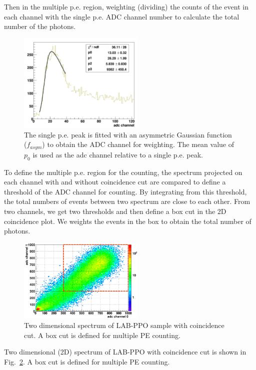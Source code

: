 Then in the multiple p.e. region, weighting (dividing) the counts of the event in each channel with the single p.e. ADC channel number to calculate the total number of the photons.

\begin{figure}[htbp]
	\centering	
	\includegraphics[width=6cm]{fitSinglePE.png}
	\caption[The single p.e. peak fitted with an asymmetric Gaussian function.]{The single p.e. peak is fitted with an asymmetric Gaussian function ($f_{asym}$) to obtain the ADC channel for weighting. The mean value of $p_0$ is used as the adc channel relative to a single p.e. peak.}
	\label{fitSinglePE}
\end{figure}

To define the multiple p.e. region for the counting, the spectrum projected on each channel with and without coincidence cut are compared to define a threshold of the ADC channel for counting. By integrating from this threshold, the total numbers of events between two spectrum are close to each other. From two channels, we get two thresholds and then define a box cut in the 2D coincidence plot. We weights the events in the box to obtain the total number of photons.
\begin{figure}[htbp]
	\centering	
	\includegraphics[width=6cm]{TeLS_2DboxCut.png}
	\caption[Two dimensional spectrum of LAB-PPO sample with coincidence cut.]{Two dimensional spectrum of LAB-PPO sample with coincidence cut. A box cut is defined for multiple PE counting.}
	\label{2DboxCut}
\end{figure}

Two dimensional (2D) spectrum of LAB-PPO with coincidence cut is shown in Fig.~\ref{2DboxCut}. A box cut is defined for multiple PE counting. 


